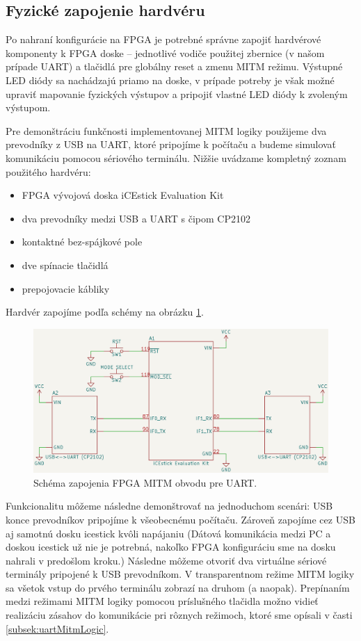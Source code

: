 \subsection{Fyzické zapojenie hardvéru}
Po nahraní konfigurácie na FPGA je potrebné správne zapojiť hardvérové komponenty k FPGA doske -- jednotlivé vodiče použitej zbernice (v našom prípade UART) a tlačidlá pre globálny reset a zmenu MITM režimu. Výstupné LED diódy sa nachádzajú priamo na doske, v prípade potreby je však možné upraviť mapovanie fyzických výstupov a pripojiť vlastné LED diódy k zvoleným výstupom.

Pre demonštráciu funkčnosti implementovanej MITM logiky použijeme dva prevodníky z USB na UART, ktoré pripojíme k počítaču a budeme simulovať komunikáciu pomocou sériového terminálu. Nižšie uvádzame kompletný zoznam použitého hardvéru:
\begin{itemize}
    \item FPGA vývojová doska iCEstick Evaluation Kit
    \item dva prevodníky medzi USB a UART s čipom CP2102
    \item kontaktné bez-spájkové pole
    \item dve spínacie tlačidlá
    \item prepojovacie kábliky
\end{itemize}
Hardvér zapojíme podľa schémy na obrázku \ref{obr:schemeUartMitm}.

\begin{figure}
    \centerline{\includegraphics[width=1\textwidth]{images/schematics/schemeUartMitm.png}}
    \caption[Schéma zapojenia FPGA MITM obvodu pre UART]{Schéma zapojenia FPGA MITM obvodu pre UART.}
    \label{obr:schemeUartMitm}
\end{figure}

Funkcionalitu môžeme následne demonštrovať na jednoduchom scenári: USB konce prevodníkov pripojíme k všeobecnému počítaču. Zároveň zapojíme cez USB aj samotnú dosku icestick kvôli napájaniu (Dátová komunikácia medzi PC a doskou icestick už nie je potrebná, nakoľko FPGA konfiguráciu sme na dosku nahrali v predošlom kroku.) Následne môžeme otvoriť dva virtuálne sériové terminály pripojené k USB prevodníkom. V transparentnom režime MITM logiky sa všetok vstup do prvého terminálu zobrazí na druhom (a naopak). Prepínaním medzi režimami MITM logiky pomocou príslušného tlačidla možno vidieť realizáciu zásahov do komunikácie pri rôznych režimoch, ktoré sme opísali v časti \ref{subsek:uartMitmLogic}.

